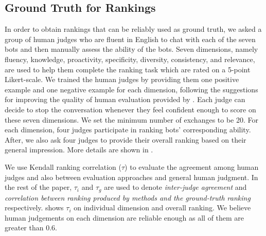 \subsection{Ground Truth for Rankings}
In order to obtain rankings that can be reliably used as ground truth, 
we asked a group of human judges who are fluent in English to chat 
with each of the seven bots and then manually assess the ability of 
the bots. 
Seven dimensions, namely fluency, 
knowledge, proactivity, specificity, 
diversity, consistency, and relevance, 
are used to help them complete the ranking task 
which are rated on a 5-point Likert-scale. 
We trained the human judges by providing them one 
positive example and one negative example for each dimension,
 following the suggestions for improving the quality
of human evaluation 
provided by \citet{clark-etal-2021-thats}.
Each judge can decide to 
stop the conversation whenever they feel confident enough to score
on these seven dimensions. We set the minimum number of exchanges
to be 20.
For each dimension, four judges participate in ranking 
bots' corresponding ability.
After, we also ask four judges to provide their 
overall ranking based on their general impression.
More details are shown in .

We use Kendall ranking correlation ($\tau$) to evaluate the agreement 
among human judges and also between evaluation approaches and 
general human judgment. 
In the rest of the paper,
$\tau_{i}$ and $\tau_{g}$ are used to denote \textit{inter-judge agreement} 
and \textit{correlation between ranking produced by methods and the ground-truth
ranking} respectively.  
 shows $\tau_i$ on individual dimension and overall ranking. 
We believe
human judgements 
on each dimension
are reliable enough
as all of them
are greater than
0.6.

